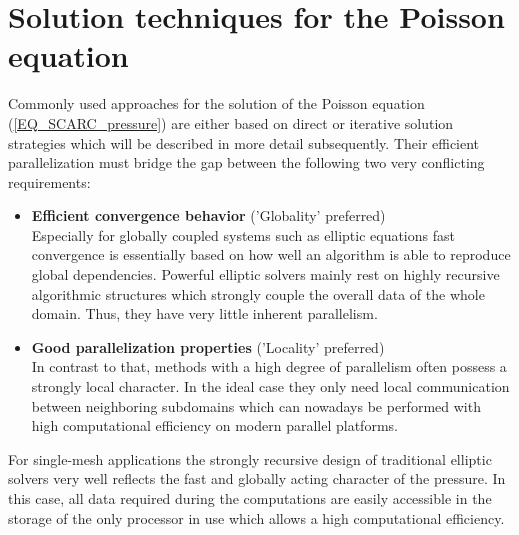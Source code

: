\section{Solution techniques for the Poisson equation}
\label{SEC_SCARC_solver}

Commonly used approaches for the solution of the Poisson equation (\ref{EQ_SCARC_pressure}) 
 are either based on direct or iterative solution strategies which will be described in more detail subsequently. Their efficient parallelization must bridge the gap between the following two very conflicting requirements:
\begin{itemize}
\item {\bf Efficient convergence behavior} ('Globality' preferred)\\
Especially for globally coupled systems such as elliptic equations fast convergence is essentially based on how well an algorithm is able to reproduce global dependencies. Powerful elliptic solvers mainly rest on highly recursive algorithmic structures which strongly couple the overall data of the whole domain. Thus, they have very little inherent parallelism. 
\item {\bf Good parallelization properties} ('Locality' preferred)\\
In contrast to that, methods with a high degree of parallelism often possess a strongly local character. In the ideal case they only need local communication between neighboring subdomains which can nowadays be performed with high computational efficiency on modern parallel platforms.  
\end{itemize}


For single-mesh applications the strongly recursive design of traditional elliptic solvers very well reflects the fast and globally acting character of the pressure. In this case, all data required during the computations are easily accessible in the storage of the only processor in use which allows a high computational efficiency. 

